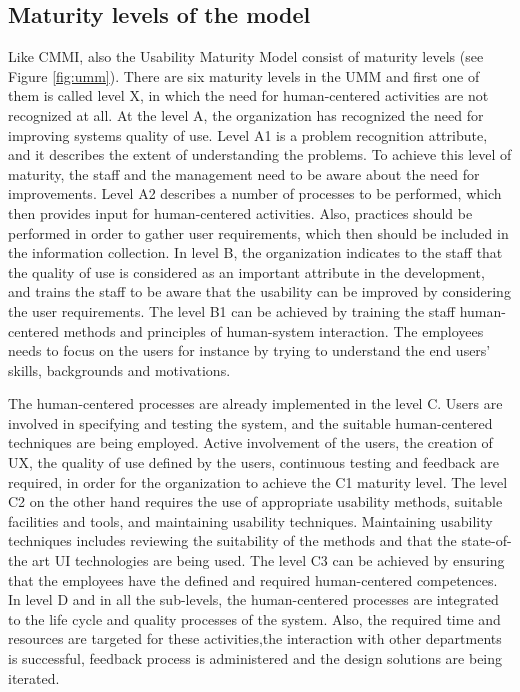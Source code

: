 \documentclass[12pt,a4paper,oneside,pdftex]{report}
\begin{document}
 \subsection{Maturity levels of the model}
Like CMMI, also the Usability Maturity Model consist of maturity levels (see Figure \ref{fig:umm}). There are six maturity levels in the UMM and first one of them is called level X, in which the need for human-centered activities are not recognized at all. At the level A, the organization has recognized the need for improving systems quality of use. Level A1 is a problem recognition attribute, and it describes the extent of understanding the problems. To achieve this level of maturity, the staff and the management need to be aware about the need for improvements. Level A2 describes a number of processes to be performed, which then provides input for human-centered activities. Also, practices should be performed in order to gather user requirements, which then should be included in the information collection. In level B, the organization indicates to the staff that the quality of use is considered as an important attribute in the development, and trains the staff to be aware that the usability can be improved by considering the user requirements. The level B1 can be achieved by training the staff human-centered methods and principles of human-system interaction. The employees needs to focus on the users for instance by trying to understand the end users' skills, backgrounds and motivations. \cite{RefWorks:30}

The human-centered processes are already implemented in the level C. Users are involved in specifying and testing the system, and the suitable human-centered techniques are being employed. Active involvement of the users, the creation of UX, the quality of use defined by the users, continuous testing and feedback are required, in order for the organization to achieve the C1 maturity level. The level C2 on the other hand requires the use of appropriate usability methods, suitable facilities and tools, and maintaining usability techniques. Maintaining usability techniques includes reviewing the suitability of the methods and that the state-of-the  art UI technologies are being used. The level C3 can be achieved by ensuring that the employees have the defined and required human-centered competences. In level D and in all the sub-levels, the human-centered processes are integrated to the life cycle and quality processes of the system. Also, the required time and resources are targeted for these activities,the interaction with other departments is successful, feedback process is administered and the design solutions are being iterated. \cite{RefWorks:30}
\end{document}
